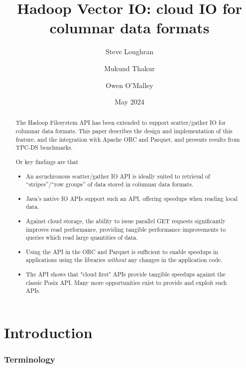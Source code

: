 \documentclass[manuscript]{acmart}
\title[Hadoop Vector IO]{Hadoop Vector IO: cloud IO for columnar data formats}
\author{Steve Loughran}
\author{Mukund Thakur}
\author{Owen O'Malley}
\date{May 2024}
\begin{document}

\begin{abstract}
The Hadoop Filesystem API has been extended to support scatter/gather IO
for columnar data formats.
This paper describes the design and implementation of this feature,
and the integration with Apache ORC and Parquet, and
presents results from TPC-DS benchmarks.

Or key findings are that
\begin{itemize}
  \item An asynchronous scatter/gather IO API is ideally suited to retrieval
  of ``stripes''/``row groups'' of data stored in columnar data formats.
  \item Java's native IO APIs support such an API, offering speedups when reading
  local data.
  \item Against cloud storage, the ability to issue parallel GET requests
        significantly improves read performance, providing tangible performance
        improvements to queries which read large quantities of data.
  \item Using the API in the ORC and Parquet is sufficient to enable
        speedups in applications using the libraries \emph{without} any
        changes in the application code.
  \item The API shows that "cloud first" APIs provide tangible speedups
        against the classic Posix API. Many more opportunities exist to
        provide and exploit such APIs.
\end{itemize}

\end{abstract}



\maketitle


\section{Introduction}
\label{sec:introduction}



\subsubsection{Terminology}
\end{document}
